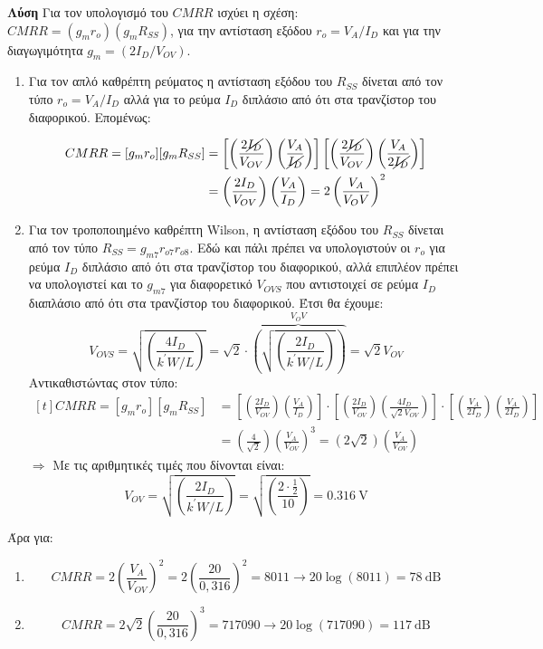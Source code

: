 \documentclass[11pt,a4paper,titlepage,fleqn]{article}
\begin{document}
	\textbf{Λύση}
	Για τον υπολογισμό του $CMRR$ ισχύει η σχέση: $CMRR=(g_mr_o)(g_mR_{SS})$, για την αντίσταση εξόδου $r_o=V_A / I_D$ και για την διαγωγιμότητα $g_m=(2I_D / V_{OV})$.
	\begin{enumerate}[label=\noanw\alph*.]
		\item Για τον απλό καθρέπτη ρεύματος η αντίσταση εξόδου του $R_{SS}$ δίνεται από τον τύπο $r_o=V_A / I_D$ αλλά για το ρεύμα $I_D$ διπλάσιο από ότι στα τρανζίστορ του διαφορικού. Επομένως:
		
		\[
		\begin{aligned}[t]
		CMRR=[g_mr_o][g_mR_{SS}] &= \left[\left(\frac{2\cancel{I_D}}{V_{OV}}\right)\left(\frac{V_A}{\cancel{I_D}}\right)\right] \left[\left(\frac{2\cancel{I_D}}{V_{OV}}\right)\left(\frac{V_A}{2\cancel{I_D}}\right)\right] 
		\\ &=  
		\left(\frac{2I_D}{V_{OV}}\right)\left(\frac{V_A}{I_D}\right)
		= 2 \left( \frac{V_A}{V_OV} \right)^2
		 \end{aligned}
		 \]
		 \item Για τον τροποποιημένο καθρέπτη Wilson, η αντίσταση εξόδου του $R_{SS}$ δίνεται από τον τύπο $R_{SS}=g_{m7}r_{o7}r_{o8}$. Εδώ και πάλι πρέπει να υπολογιστούν οι $r_o$ για ρεύμα $I_D$ διπλάσιο από ότι στα τρανζίστορ του διαφορικού, αλλά επιπλέον πρέπει να υπολογιστεί και το $g_{m7}$ για διαφορετικό $V_{OVS}$ που αντιστοιχεί σε ρεύμα $I_D$ διαπλάσιο από ότι στα τρανζίστορ του διαφορικού.
		 Έτσι θα έχουμε:
		 \[V_{OVS} = \sqrt{\left(\frac{4I_D}{k^{'} W/L}\right)} = \sqrt2 \cdot  \overbrace{ \left( \sqrt{\left(\frac{2I_D}{k^{'} W/L}\right)}\right)}^{V_OV}   = \sqrt2 V_{OV}\]
		 Αντικαθιστώντας στον τύπο: 
		 \[
		 \begin{aligned}[t]
		 	CMRR=[g_mr_o][g_mR_{SS}] 
		 	&= \left[\left(\frac{2I_D}{V_{OV}}\right)\left(\frac{V_A}{I_D}\right)\right] \cdot 
		 	\left[\left(\frac{2I_D}{V_{OV}}\right)\left(\frac{4I_D}{\sqrt{2}V_{OV}}\right)\right] \cdot 
		 	\left[\left(\frac{V_A}{2I_D}\right)\left(\frac{V_A}{2I_D}\right)\right]  \\
		 	&= \left(\frac{4}{\sqrt{2}}\right) \left(\frac{V_A}{V_{OV}}\right)^3 = \left(2\sqrt{2}\right) \left(\frac{V_A}{V_{OV}}\right)
		 \end{aligned}
		 \]
		 $\Rightarrow$ Με τις αριθμητικές τιμές που δίνονται είναι:
		 \[V_{OV} = \sqrt{\left(\frac{2I_D}{k^{'} W/L}\right)} = \sqrt{\left(\frac{2\cdot \tfrac{1}{2}}{10}\right)} = \SI{0,316}{\volt}\] 
		 
	\end{enumerate}
	Άρα για:
	\begin{enumerate}[label=\noanw\alph*.]
	\item 	\[CMRR= 2\left(\frac{V_A}{V_{OV}}\right)^2=2\left(\frac{20}{0,316}\right)^2=8011 \rightarrow 20\log(8011) = \SI{78}{\deci\bel} \]
	\item 	\[CMRR= 2\sqrt{2}\left(\frac{20}{0,316}\right)^3=717090 \rightarrow 20\log(717090) = \SI{117}{\deci\bel} \]
	\end{enumerate}
\end{document}
